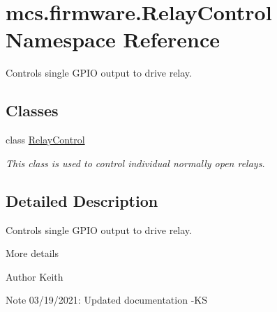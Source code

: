 \hypertarget{namespacemcs_1_1firmware_1_1RelayControl}{}\section{mcs.\+firmware.\+Relay\+Control Namespace Reference}
\label{namespacemcs_1_1firmware_1_1RelayControl}


Controls single G\+P\+IO output to drive relay.  


\subsection*{Classes}
\begin{DoxyCompactItemize}
\item 
class \hyperlink{classmcs_1_1firmware_1_1RelayControl_1_1RelayControl}{Relay\+Control}
\begin{DoxyCompactList}\small\item\em This class is used to control individual normally open relays. \end{DoxyCompactList}\end{DoxyCompactItemize}


\subsection{Detailed Description}
Controls single G\+P\+IO output to drive relay. 

More details \begin{DoxyAuthor}{Author}
Keith 
\end{DoxyAuthor}
\begin{DoxyNote}{Note}
03/19/2021\+: Updated documentation -\/\+KS 
\end{DoxyNote}
